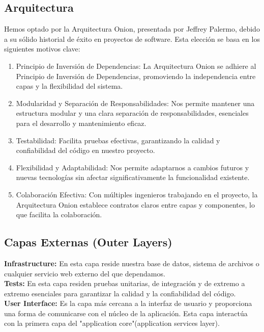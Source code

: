 \documentclass[a4paper]{article}
\begin{document}
\begin{enumerate}
\section{Arquitectura}
Hemos optado por la Arquitectura Onion, presentada por Jeffrey Palermo, debido a
su sólido historial de éxito en proyectos de software. Esta elección se basa en los
siguientes motivos clave:
\begin{enumerate}
\item Principio de Inversión de Dependencias: La Arquitectura Onion se adhiere al
Principio de Inversión de Dependencias, promoviendo la independencia entre
capas y la flexibilidad del sistema.
\item Modularidad y Separación de Responsabilidades: Nos permite mantener una
estructura modular y una clara separación de responsabilidades, esenciales
para el desarrollo y mantenimiento eficaz.
\item Testabilidad: Facilita pruebas efectivas, garantizando la calidad y confiabilidad
del código en nuestro proyecto.
\item Flexibilidad y Adaptabilidad: Nos permite adaptarnos a cambios futuros y
nuevas tecnologías sin afectar significativamente la funcionalidad existente.
\item Colaboración Efectiva: Con múltiples ingenieros trabajando en el proyecto, la
Arquitectura Onion establece contratos claros entre capas y componentes, lo
que facilita la colaboración.
\end{enumerate}
\subsection{Capas Externas (Outer Layers)}
\textbf{Infrastructure:} En esta capa reside nuestra base de datos, sistema de archivos o
cualquier servicio web externo del que dependamos.\\
\textbf{Tests:} En esta capa residen pruebas unitarias, de integración y de extremo a
extremo esenciales para garantizar la calidad y la confiabilidad del código.\\
\textbf{User Interface:} Es la capa más cercana a la interfaz de usuario y proporciona una
forma de comunicarse con el núcleo de la aplicación. Esta capa interactúa con la
primera capa del "application core"(application services layer).

\end{enumerate}
\end{document}
